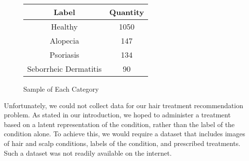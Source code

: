 \documentclass[10pt,twocolumn,letterpaper]{article}
\begin{document}
\begin{figure}[H]
\centering
\begin{tabular}{ |c|c| }
\hline
 Label & Quantity \\
\hline
 Healthy & 1050 \\
 Alopecia & 147 \\
 Psoriasis & 134 \\
 Seborrheic Dermatitis & 90 \\
\hline
\end{tabular}
\label{tblipl}
\end{figure}
\begin{figure}[htp]
  \hspace*{\fill}%
  \hfill%
  \hspace*{\fill}%

  \hspace*{\fill}%
  \hfill%
  \hspace*{\fill}%
\caption{Sample of Each Category}
\label{figsec}
\end{figure}
Unfortunately, we could not collect data for our hair treatment recommendation problem. As stated in our introduction, we hoped to administer a treatment based on a latent representation of the condition, rather than the label of the condition alone. To achieve this, we would require a dataset that includes images of hair and scalp conditions, labels of the condition, and prescribed treatments. Such a dataset was not readily available on the internet.
\end{document}
